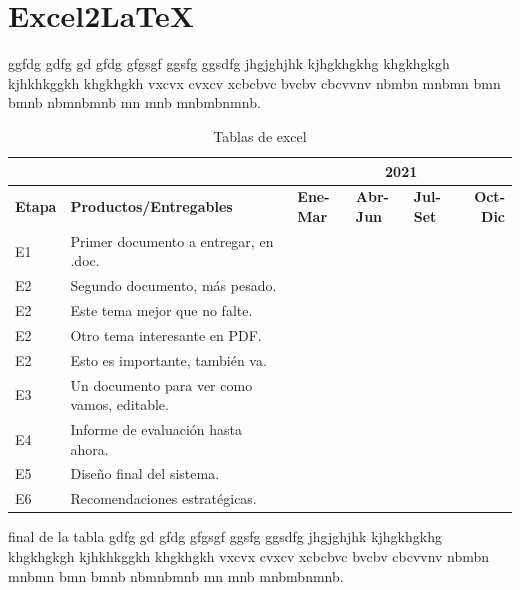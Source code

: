 \documentclass[a4paper, 12pt]{article}
\begin{document}
	\section{Excel2LaTeX}
	
	ggfdg gdfg gd gfdg gfgsgf ggsfg ggsdfg jhgjghjhk kjhgkhgkhg khgkhgkgh kjhkhkggkh khgkhgkh vxcvx cvxcv xcbcbvc bvcbv cbcvvnv nbmbn mnbmn bmn bmnb nbmnbmnb mn mnb mnbmbnmnb.
	
	\begin{table}[htbp]
		\centering
		\caption{Tablas de excel}
		\begin{tabular}{p{2.39em}p{15.28em}lllr}
			\multicolumn{1}{l}{} & \multicolumn{1}{r}{} & \multicolumn{4}{c}{\textbf{2021}} \\
			\midrule
			\textbf{Etapa} & \textbf{Productos/Entregables} & \multicolumn{1}{p{4.055em}}{\textbf{Ene-Mar}} & \multicolumn{1}{p{4.055em}}{\textbf{Abr-Jun}} & \multicolumn{1}{p{4.055em}}{\textbf{Jul-Set}} & \multicolumn{1}{p{4.055em}}{\textbf{Oct-Dic}} \\
			\midrule
			E1    & Primer documento a entregar, en .doc. &       & \cellcolor[rgb]{ .718,  .871,  .91} &       &  \\
			E2    & Segundo documento, más pesado. & \cellcolor[rgb]{ .776,  .89,  .859} &       &       &  \\
			E2    & Este tema mejor que no falte. &       & \cellcolor[rgb]{ .776,  .89,  .859} &       &  \\
			E2    & Otro tema interesante en PDF. &       &       & \cellcolor[rgb]{ .776,  .89,  .859} &  \\
			E2    & Esto es importante, también va. &       &       & \cellcolor[rgb]{ .776,  .89,  .859} &  \\
			E3    & Un documento para ver como vamos, editable. &       & \cellcolor[rgb]{ .722,  .804,  .894} &       &  \\
			E4    & Informe de evaluación hasta ahora. &       & \cellcolor[rgb]{ .722,  .804,  .894} &       &  \\
			E5    & Diseño final del sistema. &       &       &       & \cellcolor[rgb]{ .722,  .804,  .894} \\
			E6    & Recomendaciones estratégicas. &       &       &       & \cellcolor[rgb]{ .722,  .804,  .894} \\
			\bottomrule
		\end{tabular}%
		\label{tab:cronograma}%
	\end{table}%
		final de la tabla gdfg gd gfdg gfgsgf ggsfg ggsdfg jhgjghjhk kjhgkhgkhg khgkhgkgh kjhkhkggkh khgkhgkh vxcvx cvxcv xcbcbvc bvcbv cbcvvnv nbmbn mnbmn bmn bmnb nbmnbmnb mn mnb mnbmbnmnb.
	
\end{document}
